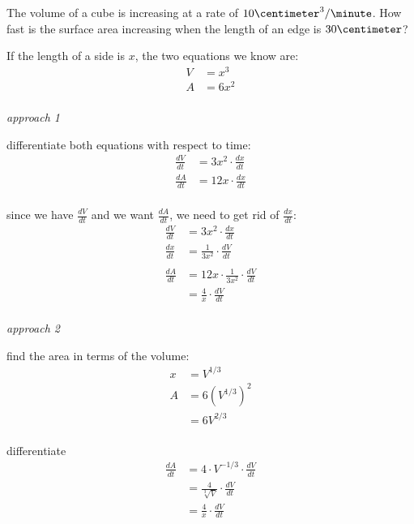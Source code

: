 \documentclass[fleqn,addpoints]{exam}
\begin{document}
\begin{questions}
\begin{solution}
\end{solution}

\question
The volume of a cube is increasing at a rate of $10 \centimeter^3 / \minute$.  How fast is the surface area increasing
when the length of an edge is $30 \centimeter$?

\begin{solution}

If the length of a side is $x$, the two equations we know are:
\begin{align*}
  V &= x^3 \\
  A &= 6x^2 \\
\end{align*}

{\em approach 1}

differentiate both equations with respect to time:
\begin{align*}
  \frac{dV}{dt} &= 3x^2 \cdot \frac{dx}{dt} \\
  \frac{dA}{dt} &= 12x \cdot \frac{dx}{dt} \\
\end{align*}

since we have $\frac{dV}{dt}$ and we want $\frac{dA}{dt}$, we need to get rid of $\frac{dx}{dt}$:
\begin{align*}
  \frac{dV}{dt} &= 3x^2 \cdot \frac{dx}{dt} \\
  \frac{dx}{dt} &= \frac{1}{3x^2} \cdot \frac{dV}{dt} \\
\\
  \frac{dA}{dt} &= 12x \cdot \frac{1}{3x^2} \cdot \frac{dV}{dt} \\
    &= \frac{4}{x} \cdot \frac{dV}{dt} \\
\end{align*}

\ifprintanswers
\pagebreak
\fi

{\em approach 2}

find the area in terms of the volume:
\begin{align*}
  x &= V^{1/3} \\
  A &= 6 \left(V^{1/3} \right)^2 \\
    &= 6 V^{2/3} \\
\end{align*}

differentiate
\begin{align*}
  \frac{dA}{dt} &= 4 \cdot V^{-1/3} \cdot \frac{dV}{dt} \\
                &= \frac{4}{\sqrt[3]{V}} \cdot \frac{dV}{dt} \\
                &= \frac{4}{x} \cdot \frac{dV}{dt} \\
\end{align*}


\end{solution}
\end{questions}
\end{document}
